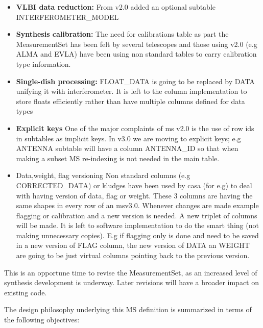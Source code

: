 \documentclass{article}
\begin{document}
\begin{itemize}

\item{{\bf VLBI data reduction:} From v2.0 added an optional subtable INTERFEROMETER\_MODEL}

\item{{\bf Synthesis calibration:} The need for calibrations table as
    part the MeasurementSet has been felt by several telescopes and
    those using v2.0 (e.g ALMA and EVLA) have been using non standard
    tables to carry calibration type information.}

\item{{\bf Single-dish processing:} FLOAT\_DATA is going to be replaced
    by DATA unifying it with interferometer. It is left to the column
    implementation to store floats efficiently rather than have
    multiple columns defined for data types }

\item{{\bf Explicit keys} One of the major complaints of ms v2.0 is
    the use of row ids in subtables as implicit keys. In v3.0 we are
    moving to explicit keys; e.g ANTENNA subtable will have a
    column ANTENNA\_ID so that when making a subset MS re-indexing is
    not needed in the main table.}

\item{{Data,weight, flag versioning} Non standard columns (e.g
    CORRECTED\_DATA) or kludges have been used by casa (for e.g) to
    deal with having version of data, flag or weight. These 3 columns
    are having the same shapes in every row of an msv3.0.  Whenever
    changes are made example flagging or calibration and a new version
    is needed. A new triplet of columns will be made. It is left to
    software implementation to do the smart thing (not making
    unnecessary copies). E.g if flagging only is done and need to be
    saved in a new version of FLAG column, the new version of DATA an
    WEIGHT are going to be just virtual columns pointing back to the
    previous version.}

\end{itemize}

This is an opportune time to revise the MeasurementSet, as an
increased level of synthesis development is underway. Later revisions
will have a broader impact on existing code.

The design philosophy underlying this MS definition is summarized in
terms of the following objectives:
\end{document}
